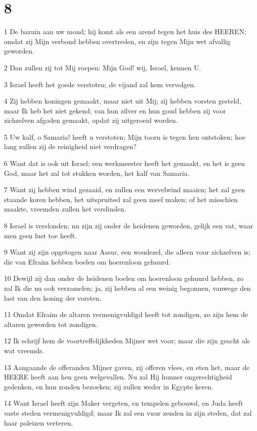 \chapter{8}

\par 1 De bazuin aan uw mond; hij komt als een arend tegen het huis des HEEREN; omdat zij Mijn verbond hebben overtreden, en zijn tegen Mijn wet afvallig geworden.
\par 2 Dan zullen zij tot Mij roepen: Mijn God! wij, Israel, kennen U.
\par 3 Israel heeft het goede verstoten; de vijand zal hem vervolgen.
\par 4 Zij hebben koningen gemaakt, maar niet uit Mij; zij hebben vorsten gesteld, maar Ik heb het niet gekend; van hun zilver en hun goud hebben zij voor zichzelven afgoden gemaakt, opdat zij uitgeroeid worden.
\par 5 Uw kalf, o Samaria! heeft u verstoten; Mijn toorn is tegen hen ontstoken; hoe lang zullen zij de reinigheid niet verdragen?
\par 6 Want dat is ook uit Israel; een werkmeester heeft het gemaakt, en het is geen God, maar het zal tot stukken worden, het kalf van Samaria.
\par 7 Want zij hebben wind gezaaid, en zullen een wervelwind maaien; het zal geen staande koren hebben, het uitspruitsel zal geen meel maken; of het misschien maakte, vreemden zullen het verslinden.
\par 8 Israel is verslonden; nu zijn zij onder de heidenen geworden, gelijk een vat, waar men geen lust toe heeft.
\par 9 Want zij zijn opgetogen naar Assur, een woudezel, die alleen voor zichzelven is; die van Efraim hebben boelen om hoerenloon gehuurd.
\par 10 Dewijl zij dan onder de heidenen boelen om hoerenloon gehuurd hebben, zo zal Ik die nu ook verzamelen; ja, zij hebben al een weinig begonnen, vanwege den last van den koning der vorsten.
\par 11 Omdat Efraim de altaren vermenigvuldigd heeft tot zondigen, zo zijn hem de altaren geworden tot zondigen.
\par 12 Ik schrijf hem de voortreffelijkheden Mijner wet voor; maar die zijn geacht als wat vreemds.
\par 13 Aangaande de offeranden Mijner gaven, zij offeren vlees, en eten het, maar de HEERE heeft aan hen geen welgevallen. Nu zal Hij hunner ongerechtigheid gedenken, en hun zonden bezoeken; zij zullen weder in Egypte keren.
\par 14 Want Israel heeft zijn Maker vergeten, en tempelen gebouwd, en Juda heeft vaste steden vermenigvuldigd; maar Ik zal een vuur zenden in zijn steden, dat zal haar paleizen verteren.

